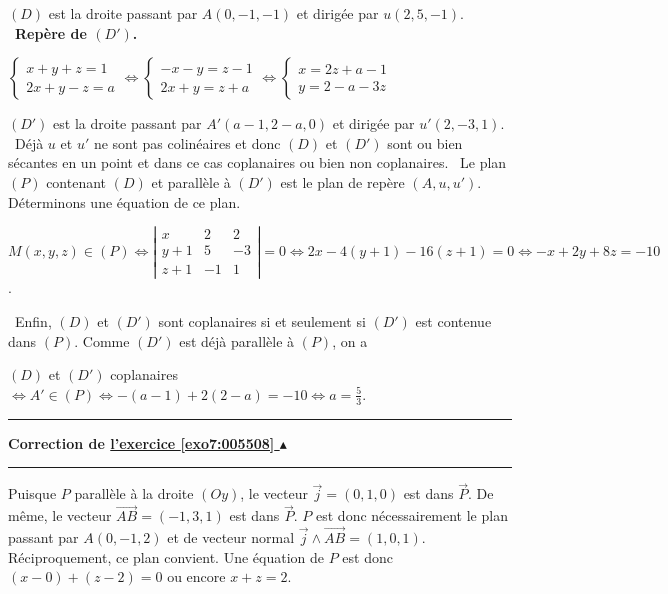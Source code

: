 \documentclass[11pt,a4paper]{article}
\newcounter{exo}
\newcommand{\correction}[1]{\hypertarget{cor7:#1}{}\label{cor7:#1}{\bf Correction de \hyperlink{exo7:#1}{l'exercice \ref{exo7:#1} $\blacktriangle$}}\vspace{1mm}\hrule\vspace{1mm}}
\newcommand{\fincorrection}{\vspace{1mm}\hrule\vspace*{7mm}}
\begin{document}
$(D)$ est la droite passant par $A(0,-1,-1)$ et dirigée par $u(2,5,-1)$.
 \textbullet~\textbf{Repère de $(D')$.}

\begin{center}$\left\{
\begin{array}{l}
x+y+z=1\\
2x+y-z=a
\end{array}
\right.\Leftrightarrow\left\{
\begin{array}{l}
-x-y=z-1\\
2x+y=z+a
\end{array}
\right.\Leftrightarrow\left\{
\begin{array}{l}
x=2z+a-1\\
y=2-a-3z
\end{array}
\right.$
\end{center}
$(D')$ est la droite passant par $A'(a-1,2-a,0)$ et dirigée par $u'(2,-3,1)$.
\textbullet~Déjà $u$ et $u'$ ne sont pas colinéaires et donc $(D)$ et $(D')$ sont ou bien sécantes en un point et dans ce cas coplanaires ou bien non coplanaires.
\textbullet~Le plan $(P)$ contenant $(D)$ et parallèle à $(D')$ est le plan de repère $(A,u,u')$. Déterminons une équation de ce plan.

\begin{center}
$M(x,y,z)\in(P)\Leftrightarrow
\left|
\begin{array}{ccc}
x&2&2\\
y+1&5&-3\\
z+1&-1&1
\end{array}\right|=0\Leftrightarrow 2x-4(y+1)-16(z+1)=0\Leftrightarrow-x+2y+8z=-10$.
\end{center}
\textbullet~Enfin, $(D)$ et $(D')$ sont coplanaires si et seulement si $(D')$ est contenue dans $(P)$. Comme $(D')$ est déjà parallèle à $(P)$, on a

\begin{center}
$(D)$ et $(D')$ coplanaires $\Leftrightarrow A'\in(P)\Leftrightarrow-(a-1)+2(2-a)=-10\Leftrightarrow a=\frac{5}{3}$.
\end{center}

\begin{center}
\end{center}
\fincorrection
\correction{005508}
Puisque $P$ parallèle à la droite $(Oy)$, le vecteur $\overrightarrow{j}=(0,1,0)$ est dans $\overrightarrow{P}$. De même, le vecteur $\overrightarrow{AB}=(-1,3,1)$ est dans $\overrightarrow{P}$.
$P$ est donc nécessairement le plan passant par $A(0,-1,2)$ et de vecteur normal $\overrightarrow{j}\wedge\overrightarrow{AB}=(1,0,1)$. Réciproquement, ce plan convient.
Une équation de $P$ est donc $(x-0)+(z-2)=0$ ou encore $x+z=2$.
\end{document}
